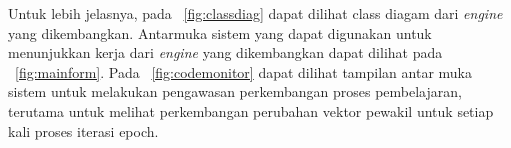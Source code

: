 Untuk lebih jelasnya, pada \pic~\ref{fig:classdiag} dapat dilihat class diagam 
dari \emph{engine} yang dikembangkan. Antarmuka sistem yang dapat digunakan
untuk menunjukkan kerja dari \emph{engine} yang dikembangkan dapat dilihat pada
\pic~\ref{fig:mainform}. Pada \pic~\ref{fig:codemonitor} dapat dilihat tampilan
antar muka sistem untuk melakukan pengawasan perkembangan proses pembelajaran, 
terutama untuk melihat perkembangan perubahan vektor pewakil  untuk setiap  kali
proses iterasi epoch.


\clearpage



